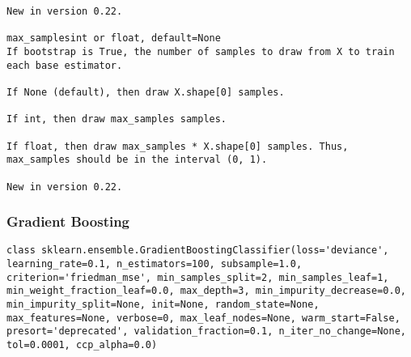 \documentclass[12pt]{article}
\begin{document}
\begin{verbatim}
New in version 0.22.

max_samplesint or float, default=None
If bootstrap is True, the number of samples to draw from X to train each base estimator.

If None (default), then draw X.shape[0] samples.

If int, then draw max_samples samples.

If float, then draw max_samples * X.shape[0] samples. Thus, max_samples should be in the interval (0, 1).

New in version 0.22.
\end{verbatim}

\newpage
\subsubsection{Gradient Boosting}
\begin{lstlisting}
class sklearn.ensemble.GradientBoostingClassifier(loss='deviance', learning_rate=0.1, n_estimators=100, subsample=1.0, criterion='friedman_mse', min_samples_split=2, min_samples_leaf=1, min_weight_fraction_leaf=0.0, max_depth=3, min_impurity_decrease=0.0, min_impurity_split=None, init=None, random_state=None, max_features=None, verbose=0, max_leaf_nodes=None, warm_start=False, presort='deprecated', validation_fraction=0.1, n_iter_no_change=None, tol=0.0001, ccp_alpha=0.0)
\end{lstlisting}
\end{document}
